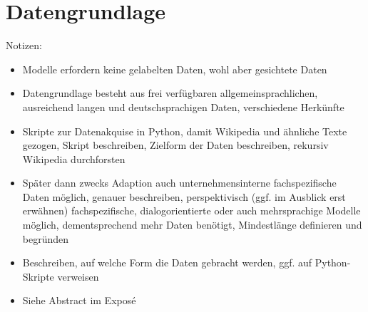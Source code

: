 \chapter{Datengrundlage}
\thispagestyle{fancy}
\label{chap:Datengrundlage}

Notizen:
\begin{itemize}
	\item Modelle erfordern keine gelabelten Daten, wohl aber gesichtete Daten
	\item Datengrundlage besteht aus frei verfügbaren allgemeinsprachlichen, ausreichend langen und deutschsprachigen Daten, verschiedene Herkünfte
	\item Skripte zur Datenakquise in Python, damit Wikipedia und ähnliche Texte gezogen, Skript beschreiben, Zielform der Daten beschreiben, rekursiv Wikipedia durchforsten
	\item Später dann zwecks Adaption auch unternehmensinterne fachspezifische Daten möglich, genauer beschreiben, perspektivisch (ggf. im Ausblick erst erwähnen) fachspezifische, dialogorientierte oder auch mehrsprachige Modelle möglich, dementsprechend mehr Daten benötigt, Mindestlänge definieren und begründen
	\item Beschreiben, auf welche Form die Daten gebracht werden, ggf. auf Python-Skripte verweisen
	\item Siehe Abstract im Exposé
\end{itemize}
